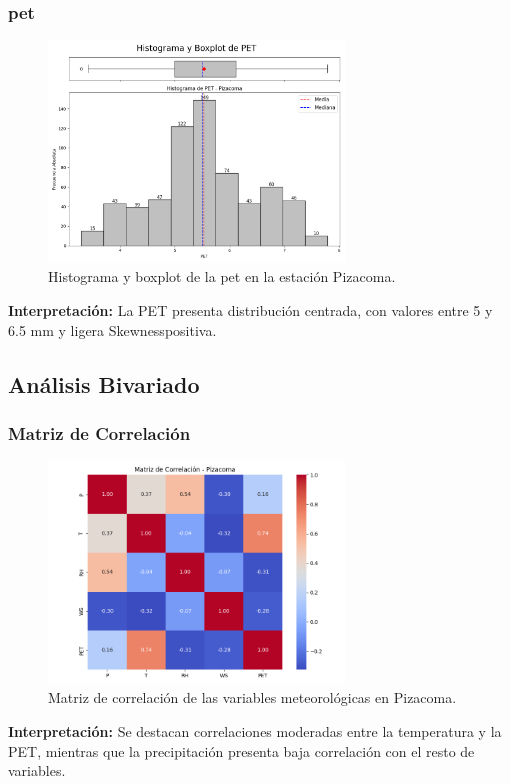 \subsubsection*{\gls{pet} }
\begin{figure}[htbp]
\centering
\includegraphics[width=0.7\textwidth]{resultados/por_estacion_meteorologica/Pizacoma/PET_histograma.png}
\caption{Histograma y boxplot de la \gls{pet}  en la estación Pizacoma.}
\label{fig:pizacoma_PET}
\end{figure}
\textbf{Interpretación:} La PET presenta distribución centrada, con valores entre 5 y 6.5 mm y ligera Skewnesspositiva.

\subsection{Análisis Bivariado}

\subsubsection*{Matriz de Correlación}
\begin{figure}[htbp]
\centering
\includegraphics[width=0.7\textwidth]{resultados/por_estacion_meteorologica/Pizacoma/matriz_correlacion.png}
\caption{Matriz de correlación de las variables meteorológicas en Pizacoma.}
\label{fig:pizacoma_corr}
\end{figure}
\textbf{Interpretación:} Se destacan correlaciones moderadas entre la temperatura y la PET, mientras que la precipitación presenta baja correlación con el resto de variables.

